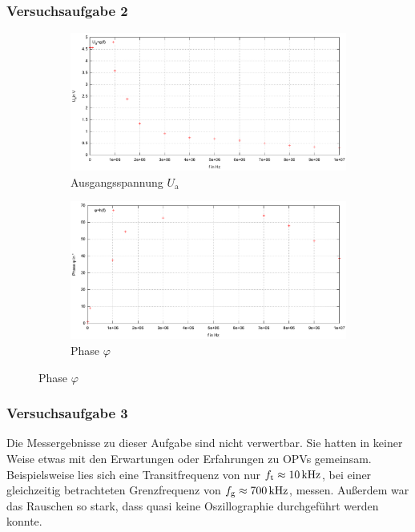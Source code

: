 \documentclass[numbers=noenddot,12pt,a4paper]{scrartcl}
\newcommand{\ix}[1]{_\text{#1}}
\begin{document}
\subsubsection{Versuchsaufgabe 2}
\begin{figure}[H]
\centering
\begin{subfigure}[b]{\textwidth}
\includegraphics[width=\textwidth]{aufg2.pdf}
\caption{Ausgangsspannung $U\ix{a}$} \label{img:aufg2spannung}
\end{subfigure}
\begin{subfigure}[b]{\textwidth}
\includegraphics[width=\textwidth]{aufg22.pdf}
\caption{Phase $\varphi$} \label{img:aufg2phase}
\end{subfigure}
\end{figure}
\subsubsection{Versuchsaufgabe 3}
Die Messergebnisse zu dieser Aufgabe sind nicht verwertbar. Sie hatten in keiner Weise etwas mit den Erwartungen oder Erfahrungen zu OPVs gemeinsam. Beispielsweise lies sich eine Transitfrequenz von nur $f\ix{t}\approx\unit[10]{kHz}$, bei einer gleichzeitig betrachteten Grenzfrequenz von $f\ix{g}\approx\unit[700]{kHz}$, messen. Außerdem war das Rauschen so stark, dass quasi keine Oszillographie durchgeführt werden konnte.
\end{document}
